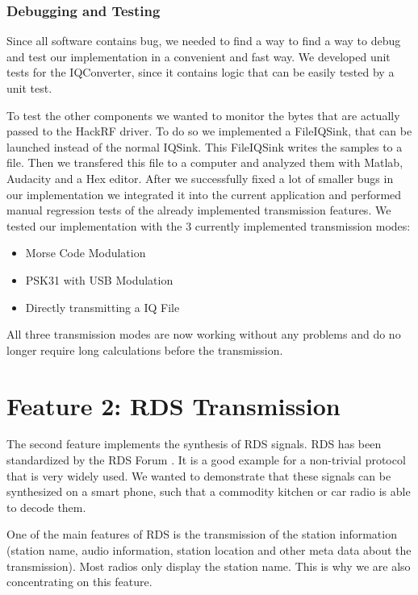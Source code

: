 \subsubsection{Debugging and Testing}
Since all software contains bug, we needed to find a way to find a way to debug and test our implementation in a convenient and fast way. We developed unit tests for the IQConverter, since it contains logic that can be easily tested by a unit test. 

To test the other components we wanted to monitor the bytes that are actually passed to the HackRF driver. To do so we implemented a FileIQSink, that can be launched instead of the normal IQSink. This FileIQSink writes the samples to a file. Then we transfered this file to a computer and analyzed them with Matlab, Audacity and a Hex editor. 
After we successfully fixed a lot of smaller bugs in our implementation we integrated it into the current application and performed manual regression tests of the already implemented transmission features. We tested our implementation with the 3 currently implemented transmission modes: 
\begin{itemize}
	\item Morse Code Modulation
	\item PSK31 with USB Modulation
	\item Directly transmitting a IQ File 
\end{itemize}

All three transmission modes are now working without any problems and do no longer require long calculations before the transmission. 



\section{Feature 2: RDS Transmission}
\label{sec:impl:feature2}
The second feature implements the synthesis of \ac{RDS} signals. \ac{RDS} has been standardized by the RDS Forum \cite{RDS1999}. It is a good example for a non-trivial protocol that is very widely used. We wanted to demonstrate that these signals can be synthesized on a smart phone, such that a commodity kitchen or car radio is able to decode them. 

One of the main features of RDS is the transmission of the station information (station name, audio information, station location and other meta data about the transmission). Most radios only display the station name. This is why we are also concentrating on this feature. 

